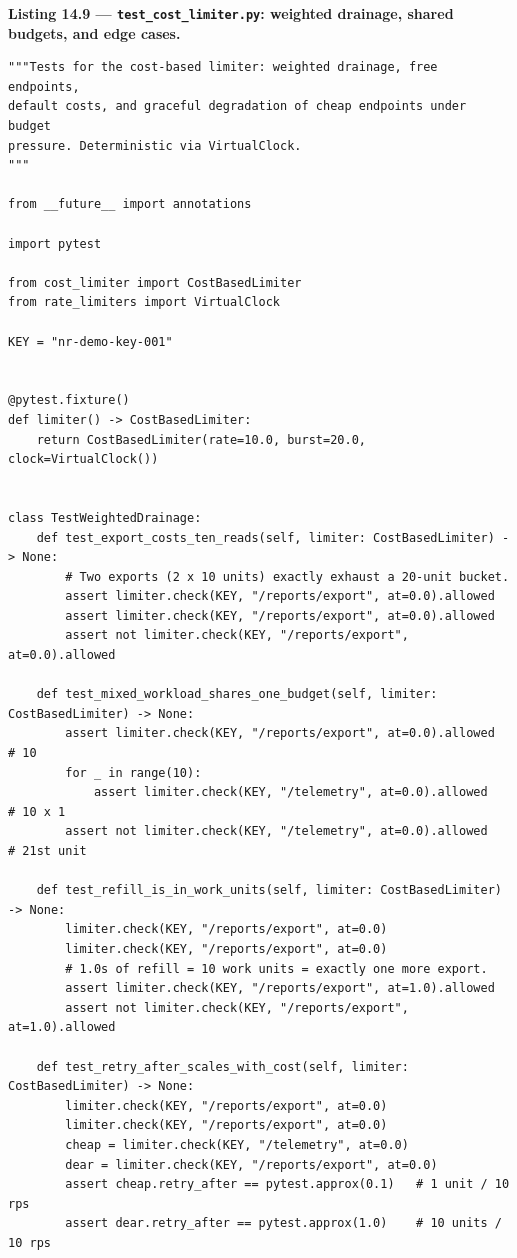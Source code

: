 \noindent\textbf{Listing 14.9 --- \texttt{test\_cost\_limiter.py}: weighted
drainage, shared budgets, and edge cases.}
\label{lst:ch14-cost-tests}
\begin{verbatim}
"""Tests for the cost-based limiter: weighted drainage, free endpoints,
default costs, and graceful degradation of cheap endpoints under budget
pressure. Deterministic via VirtualClock.
"""

from __future__ import annotations

import pytest

from cost_limiter import CostBasedLimiter
from rate_limiters import VirtualClock

KEY = "nr-demo-key-001"


@pytest.fixture()
def limiter() -> CostBasedLimiter:
    return CostBasedLimiter(rate=10.0, burst=20.0, clock=VirtualClock())


class TestWeightedDrainage:
    def test_export_costs_ten_reads(self, limiter: CostBasedLimiter) -> None:
        # Two exports (2 x 10 units) exactly exhaust a 20-unit bucket.
        assert limiter.check(KEY, "/reports/export", at=0.0).allowed
        assert limiter.check(KEY, "/reports/export", at=0.0).allowed
        assert not limiter.check(KEY, "/reports/export", at=0.0).allowed

    def test_mixed_workload_shares_one_budget(self, limiter: CostBasedLimiter) -> None:
        assert limiter.check(KEY, "/reports/export", at=0.0).allowed  # 10
        for _ in range(10):
            assert limiter.check(KEY, "/telemetry", at=0.0).allowed   # 10 x 1
        assert not limiter.check(KEY, "/telemetry", at=0.0).allowed   # 21st unit

    def test_refill_is_in_work_units(self, limiter: CostBasedLimiter) -> None:
        limiter.check(KEY, "/reports/export", at=0.0)
        limiter.check(KEY, "/reports/export", at=0.0)
        # 1.0s of refill = 10 work units = exactly one more export.
        assert limiter.check(KEY, "/reports/export", at=1.0).allowed
        assert not limiter.check(KEY, "/reports/export", at=1.0).allowed

    def test_retry_after_scales_with_cost(self, limiter: CostBasedLimiter) -> None:
        limiter.check(KEY, "/reports/export", at=0.0)
        limiter.check(KEY, "/reports/export", at=0.0)
        cheap = limiter.check(KEY, "/telemetry", at=0.0)
        dear = limiter.check(KEY, "/reports/export", at=0.0)
        assert cheap.retry_after == pytest.approx(0.1)   # 1 unit / 10 rps
        assert dear.retry_after == pytest.approx(1.0)    # 10 units / 10 rps



\end{verbatim}
